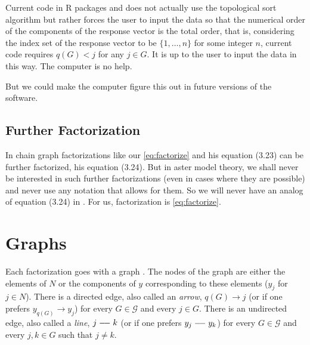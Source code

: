 Current code in R packages  and  does not
actually use the topological sort algorithm but rather forces the user
to input the data so that the numerical order of the components of the
response vector is the total order, that is, considering the index set
of the response vector to be $\{1, \ldots, n\}$ for some integer $n$,
current code requires $q(G) < j$ for any $j \in G$.
It is up to the user to input the data in this way.  The computer is no help.

But we could make the computer figure this out in future versions of the
software.

\subsection{Further Factorization}
\label{sec:further-factorize}

In \citet{lauritzen} chain graph factorizations like our \eqref{eq:factorize}
and his equation (3.23) can be further factorized, his equation (3.24).
But in aster model theory, we shall never be interested in such further
factorizations (even in cases where they are possible) and never use any
notation that allows for them.  So we will never have an analog of equation
(3.24) in \citet{lauritzen}.  For us, factorization is \eqref{eq:factorize}.

\section{Graphs}

Each factorization goes with a graph \citep[Section~3.2.3]{lauritzen}.
The nodes of the graph are either the elements of $N$ or the components
of $y$ corresponding to these elements ($y_j$ for $j \in N$).
There is a directed edge, also called an \emph{arrow},
$q(G) \longrightarrow j$ (or if one prefers $y_{q(G)} \longrightarrow y_j$)
for every $G \in \mathcal{G}$ and every $j \in G$.
There is an undirected edge, also called a \emph{line},
$j \myline k$ (or if one prefers $y_j \myline y_k$)
for every $G \in \mathcal{G}$ and every $j, k \in G$ such that $j \neq k$.

